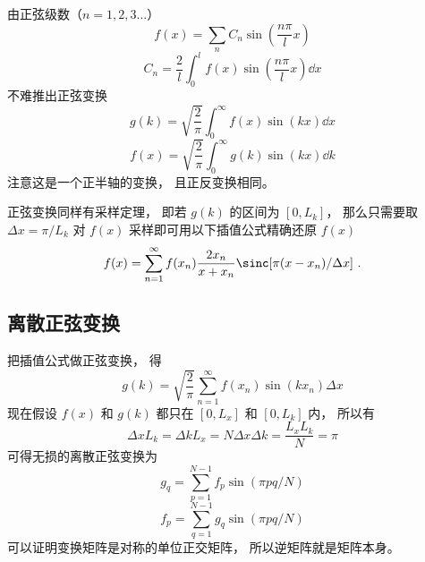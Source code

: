 

由正弦级数（$n = 1, 2, 3\dots$）
\begin{equation}
f(x) = \sum_n C_n \sin(\frac{n\pi}{l}x)
\end{equation}
\begin{equation}
C_n =  \frac2l \int_0^l f(x) \sin(\frac{n\pi}{l}x) \dd{x}
\end{equation}
不难推出正弦变换
\begin{equation}
g(k) = \sqrt{\frac{2}{\pi}} \int_0^{\infty} f(x) \sin(kx) \dd{x}
\end{equation}
\begin{equation}
f(x) = \sqrt{\frac{2}{\pi}} \int_0^{\infty} g(k) \sin(kx) \dd{k}
\end{equation}
注意这是一个正半轴的变换， 且正反变换相同。

正弦变换同样有采样定理， 即若 $g(k)$ 的区间为 $[0, L_k]$， 那么只需要取 $\Delta x = \pi/L_k$ 对 $f(x)$ 采样即可用以下插值公式精确还原 $f(x)$
\begin{equation}
f(x) = \sum_{n=1}^\infty f(x_n)\frac{2x_n}{x+x_n}\sinc[\pi(x-x_n)/\Delta x]~.
\end{equation} 

\subsection{离散正弦变换}
把插值公式做正弦变换， 得
\begin{equation}
g(k) = \sqrt{\frac{2}{\pi}} \sum_{n=1}^\infty f(x_n) \sin(k x_n) \Delta x
\end{equation}
现在假设 $f(x)$ 和 $g(k)$ 都只在 $[0, L_x]$ 和 $[0, L_k]$ 内， 所以有
\begin{equation}
\Delta x L_k = \Delta k L_x = N\Delta x\Delta k = \frac{L_xL_k}{N} = \pi
\end{equation}
可得无损的离散正弦变换为
\begin{equation}
g_q = \sum_{p = 1}^{N-1} f_p \sin(\pi pq/N)
\end{equation}
\begin{equation}
f_p = \sum_{q = 1}^{N-1} g_q \sin(\pi pq/N)
\end{equation}
可以证明变换矩阵是对称的单位正交矩阵， 所以逆矩阵就是矩阵本身。
